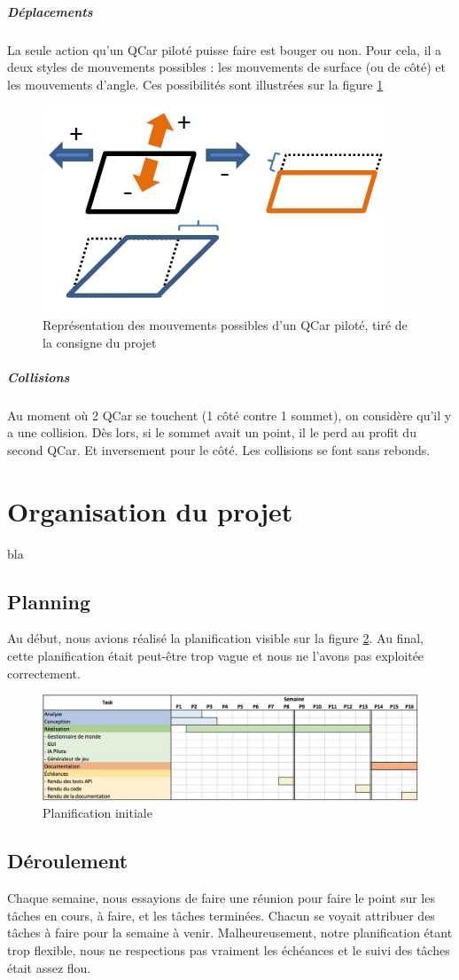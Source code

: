 \documentclass[a4paper, 12pt]{article}
\begin{document}
\subparagraph{Déplacements}
La seule action qu'un QCar piloté puisse faire est bouger ou non. Pour cela, il a deux styles de mouvements possibles : les mouvements de surface (ou de côté) et les mouvements d'angle. Ces possibilités sont illustrées sur la figure \ref{fig:qcardepl}
\begin{figure}[h!]
\centering
\includegraphics[width=0.4\linewidth]{includes/images/qcar_depl}
\caption{Représentation des mouvements possibles d'un QCar piloté, tiré de la consigne du projet}
\label{fig:qcardepl}
\end{figure}
\subparagraph{Collisions}
Au moment où 2 QCar se touchent (1 côté contre 1 sommet), on considère qu'il y a une collision. Dès lors, si le sommet avait un point, il le perd au profit du second QCar. Et inversement pour le côté. Les collisions se font sans rebonds.
\section{Organisation du projet}
bla
\subsection{Planning}
Au début, nous avions réalisé la planification visible sur la figure \ref{fig:planning}. Au final, cette planification était peut-être trop vague et nous ne l'avons pas exploitée correctement.
\begin{figure}[H]
\centering
\includegraphics[width=1\linewidth]{includes/images/planning}
\caption{Planification initiale}
\label{fig:planning}
\end{figure}
\subsection{Déroulement}
Chaque semaine, nous essayions de faire une réunion pour faire le point sur les tâches en cours, à faire, et les tâches terminées. Chacun se voyait attribuer des tâches à faire pour la semaine à venir. Malheureusement, notre planification étant trop flexible, nous ne respections pas vraiment les échéances et le suivi des tâches était assez flou.
\end{document}

